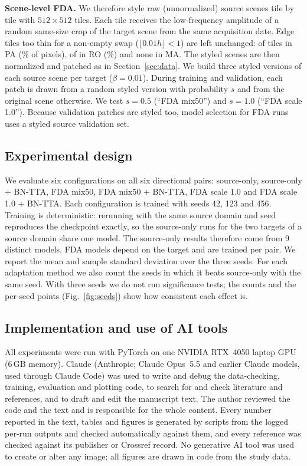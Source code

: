 \documentclass[pdflatex,sn-basic]{sn-jnl}
\newcommand{\BNTTA}{BN-TTA}
\begin{document}
\textbf{Scene-level FDA.}
We therefore style raw (unnormalized) source scenes tile by tile with $512\times512$ tiles.
Each tile receives the low-frequency amplitude of a random same-size crop of the target scene from the same acquisition date.
Edge tiles too thin for a non-empty swap ($\lfloor0.01h\rfloor<1$) are left unchanged: \FDAUnstyledPA{} of \FDATilesPA{} tiles in PA (\FDAUnstyledPctPA\% of pixels), \FDAUnstyledRO{} of \FDATilesRO{} in RO (\FDAUnstyledPctRO\%) and none in MA.
The styled scenes are then normalized and patched as in Section~\ref{sec:data}.
We build three styled versions of each source scene per target ($\beta=0.01$).
During training and validation, each patch is drawn from a random styled version with probability $s$ and from the original scene otherwise.
We test $s=0.5$ (``FDA mix50'') and $s=1.0$ (``FDA scale 1.0'').
Because validation patches are styled too, model selection for FDA runs uses a styled source validation set.

\subsection{Experimental design}



We evaluate six configurations on all six directional pairs: source-only, source-only + \BNTTA{}, FDA mix50, FDA mix50 + \BNTTA{}, FDA scale 1.0 and FDA scale 1.0 + \BNTTA{}.
Each configuration is trained with seeds 42, 123 and 456.
Training is deterministic: rerunning with the same source domain and seed reproduces the checkpoint exactly, so the source-only runs for the two targets of a source domain share one model.
The source-only results therefore come from 9 distinct models.
FDA models depend on the target and are trained per pair.
We report the mean and sample standard deviation over the three seeds.
For each adaptation method we also count the seeds in which it beats source-only with the same seed.
With three seeds we do not run significance tests; the counts and the per-seed points (Fig.~\ref{fig:seeds}) show how consistent each effect is.

\subsection{Implementation and use of AI tools}\label{sec:impl}

All experiments were run with PyTorch on one NVIDIA RTX~4050 laptop GPU (6\,GB memory).
Claude (Anthropic; Claude Opus~5.5 and earlier Claude models, used through Claude Code) was used to write and debug the data-checking, training, evaluation and plotting code, to search for and check literature and references, and to draft and edit the manuscript text.
The author reviewed the code and the text and is responsible for the whole content.
Every number reported in the text, tables and figures is generated by scripts from the logged per-run outputs and checked automatically against them, and every reference was checked against its publisher or Crossref record.
No generative AI tool was used to create or alter any image; all figures are drawn in code from the study data.
\end{document}
